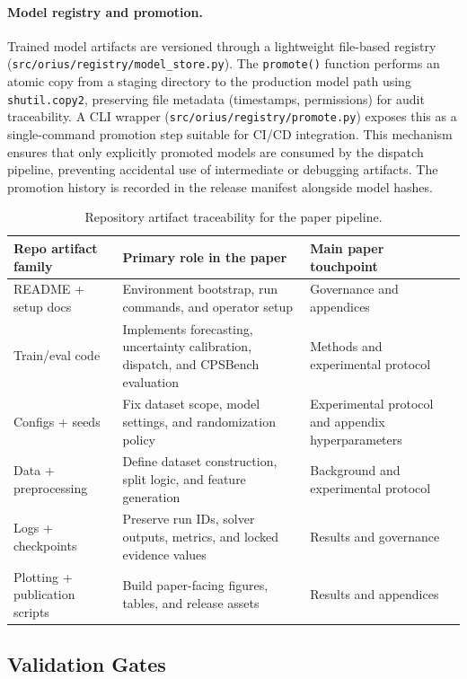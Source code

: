 \documentclass[11pt,a4paper]{article}
\begin{document}
\paragraph{Model registry and promotion.}
Trained model artifacts are versioned through a lightweight file-based registry (\texttt{src/orius/registry/model\_store.py}). The \texttt{promote()} function performs an atomic copy from a staging directory to the production model path using \texttt{shutil.copy2}, preserving file metadata (timestamps, permissions) for audit traceability. A CLI wrapper (\texttt{src/orius/registry/promote.py}) exposes this as a single-command promotion step suitable for CI/CD integration. This mechanism ensures that only explicitly promoted models are consumed by the dispatch pipeline, preventing accidental use of intermediate or debugging artifacts. The promotion history is recorded in the release manifest alongside model hashes.

\begin{table}[htbp]
\centering\small
\caption{Repository artifact traceability for the paper pipeline.}
\label{tab:repo_traceability}
\begin{tabular}{p{3.1cm}p{4.2cm}p{5.8cm}}
\toprule
Repo artifact family & Primary role in the paper & Main paper touchpoint \\
\midrule
README + setup docs & Environment bootstrap, run commands, and operator setup & Governance and appendices \\
Train/eval code & Implements forecasting, uncertainty calibration, dispatch, and CPSBench evaluation & Methods and experimental protocol \\
Configs + seeds & Fix dataset scope, model settings, and randomization policy & Experimental protocol and appendix hyperparameters \\
Data + preprocessing & Define dataset construction, split logic, and feature generation & Background and experimental protocol \\
Logs + checkpoints & Preserve run IDs, solver outputs, metrics, and locked evidence values & Results and governance \\
Plotting + publication scripts & Build paper-facing figures, tables, and release assets & Results and appendices \\
\bottomrule
\end{tabular}
\end{table}

\subsection{Validation Gates}
\end{document}

